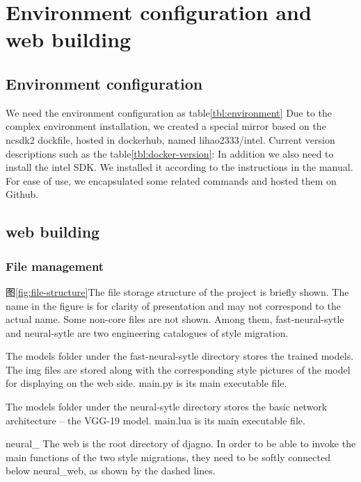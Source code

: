 \section{Environment configuration and web building}
\subsection{Environment configuration}
We need the environment configuration as table\ref{tbl:environment}
Due to the complex environment installation, we created a special mirror based on the ncsdk2 dockfile, hosted in dockerhub, named lihao2333/intel.
Current version descriptions such as the table\ref{tbl:docker-version}:
In addition we also need to install the intel SDK. We installed it according to the instructions in the manual. For ease of use, we encapsulated some related commands and hosted them on Github.\cite{rcClub}
\subsection{web building}
\subsubsection{File management}
图\ref{fig:file-structure}The file storage structure of the project is briefly shown. The name in the figure is for clarity of presentation and may not correspond to the actual name. Some non-core files are not shown.
Among them, fast-neural-sytle and neural-sytle are two engineering catalogues of style migration.

The models folder under the fast-neural-sytle directory stores the trained models. The img files are stored along with the corresponding style pictures of the model for displaying on the web side. main.py is its main executable file.

The models folder under the neural-sytle directory stores the basic network architecture -- the VGG-19 model. main.lua is its main executable file.

neural\_
The web is the root directory of djagno. In order to be able to invoke the main functions of the two style migrations, they need to be softly connected below neural\_web, as shown by the dashed lines.

